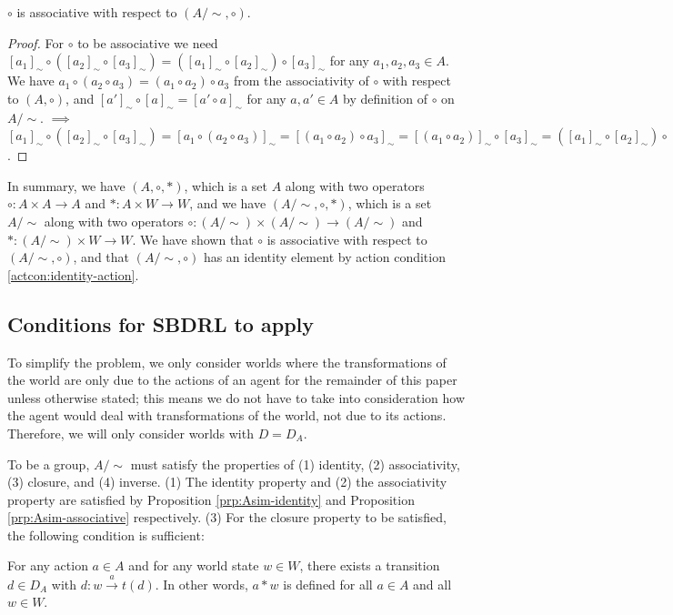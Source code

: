 \begin{proposition}\label{prp:Asim-associative}
    $\circ$ is associative with respect to $(A/\sim, \circ)$.
\end{proposition}
\begin{proof}
    For $\circ$ to be associative we need $[a_{1}]_{\sim} \circ ([a_{2}]_{\sim} \circ [a_{3}]_{\sim}) = ([a_{1}]_{\sim} \circ [a_{2}]_{\sim}) \circ [a_{3}]_{\sim}$ for any $a_{1},a_{2},a_{3} \in A$.
    We have $a_{1} \circ (a_{2} \circ a_{3}) = (a_{1} \circ a_{2}) \circ a_{3}$ from the associativity of $\circ$ with respect to $(A, \circ)$, and $[a']_{\sim} \circ [a]_{\sim} = [a' \circ a]_{\sim}$ for any $a,a' \in A$ by definition of $\circ$ on $A/\sim$.
    $\implies$ $[a_{1}]_{\sim} \circ ([a_{2}]_{\sim} \circ [a_{3}]_{\sim}) = [a_{1} \circ (a_{2} \circ a_{3})]_{\sim} = [(a_{1} \circ a_{2}) \circ a_{3}]_{\sim} = [(a_{1} \circ a_{2})]_{\sim} \circ [a_{3}]_{\sim} = ([a_{1}]_{\sim} \circ [a_{2}]_{\sim}) \circ [a_{3}]_{\sim}$.
\end{proof}

In summary, we have $(A, \circ, *)$, which is a set $A$ along with two operators $\circ: A \times A \to A$ and $*: A \times W \to W$, and we have $(A/\sim, \circ, *)$, which is a set $A/\sim$ along with two operators $\circ: (A/\sim) \times (A/\sim) \to (A/\sim)$ and $*: (A/\sim) \times W \to W$.
We have shown that $\circ$ is associative with respect to $(A/\sim, \circ)$, and that $(A/\sim, \circ)$ has an identity element by action condition \ref{actcon:identity-action}.


\subsection{Conditions for SBDRL to apply}\label{sec:World conditions}

To simplify the problem, we only consider worlds where the transformations of the world are only due to the actions of an agent for the remainder of this paper unless otherwise stated; this means we do not have to take into consideration how the agent would deal with transformations of the world, not due to its actions.
Therefore, we will only consider worlds with $D = D_{A}$.

To be a group, $A/\sim$ must satisfy the properties of (1) identity, (2) associativity, (3) closure, and (4) inverse.
(1) The identity property and (2) the associativity property are satisfied by Proposition \ref{prp:Asim-identity} and Proposition \ref{prp:Asim-associative} respectively.
(3) For the closure property to be satisfied, the following condition is sufficient:
\begin{world_condition}\label{wldcon:unrestricted-actions}
    For any action $a \in A$ and for any world state $w \in W$, there exists a transition $d \in D_{A}$ with $d: w \xrightarrow{a} t(d)$.
    In other words, $a * w$ is defined for all $a \in A$ and all $w \in W$.

\end{world_condition}

